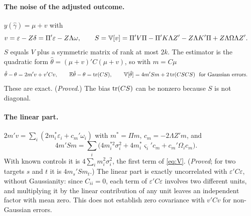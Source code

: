 \paragraph{The noise of the adjusted outcome.} $y(\hat\gamma)=\mu+v$ with
\begin{equation}\label{ctl:eq:v}
 v=\varepsilon-Z\delta=\Pi'\varepsilon-Z\Lambda\omega,\qquad
 S=\mathbb{V}[v]=\Pi'V\Pi-\Pi'K\Lambda Z'-Z\Lambda K'\Pi+Z\Lambda\Omega\Lambda Z'.
\end{equation}
$S$ equals $V$ plus a symmetric matrix of rank at most $2k$. The estimator is the quadratic form
$\hat\theta=(\mu+v)'C(\mu+v)$, so with $m=C\mu$
\begin{equation}\label{ctl:eq:exact}
 \hat\theta-\theta=2m'v+v'Cv,\qquad \mathbb{E}\hat\theta-\theta=\operatorname{tr}(CS),\qquad
 \mathbb{V}[\hat\theta]=4m'Sm+2\operatorname{tr}(CSCS)\ \text{ for Gaussian errors.}
\end{equation}
These are exact. (\emph{Proved.}) The bias $\operatorname{tr}(CS)$ can be nonzero because $S$ is not diagonal.

\paragraph{The linear part.} $2m'v=\sum_i(2m_i^*\varepsilon_i+c_m'\omega_i)$ with $m^*=\Pi m$, $c_m=-2\Lambda Z'm$, and
\begin{equation}\label{ctl:eq:Vlin}
 4m'Sm=\sum_i\bigl(4m_i^{*2}\sigma_i^2+4m_i^*\varsigma_i'c_m+c_m'\Omega_ic_m\bigr).
\end{equation}
With known controls it is $4\sum_im_i^2\sigma_i^2$, the first term of \eqref{eq:V}. (\emph{Proved}; for two
targets $s$ and $t$ it is $4m_s'Sm_t$.) The linear part is exactly uncorrelated with $\varepsilon'C\varepsilon$,
without Gaussianity: since $C_{ii}=0$, each term of $\varepsilon'C\varepsilon$ involves two different units, and
multiplying it by the linear contribution of any unit leaves an independent factor with mean zero. This does not
establish zero covariance with $v'Cv$ for non-Gaussian errors.

